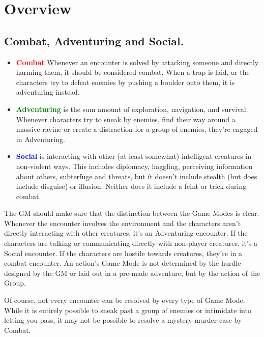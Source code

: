 \chapter{Overview}\label{ch:gameModeOverview}
\section{Combat, Adventuring and Social.}\label{sec:gameModeList}
\begin{itemize}
	\item \textcolor{red}{\textbf{Combat}} Whenever an encounter is solved by attacking someone and directly harming them, it should be considered combat.
	When a trap is laid, or the characters try to defeat enemies by pushing a boulder onto them, it is adventuring instead.

	\item \textcolor{green}{\textbf{Adventuring}} is the sum amount of exploration, navigation, and survival.
	Whenever characters try to sneak by enemies, find their way around a massive ravine or create a distraction for a group of enemies, they're engaged in Adventuring.

	\item \textcolor{blue}{\textbf{Social}} is interacting with other (at least somewhat) intelligent creatures in non-violent ways.
	This includes diplomacy, haggling, perceiving information about others, subterfuge and threats, but ít doesn't include stealth (but does include disguise) or illusion. 
	Neither does it include a feint or trick during combat.
	
\end{itemize}

The GM should make sure that the distinction between the Game Modes is clear. 
Whenever the encounter involves the environment and the characters aren't directly interacting with other creatures, it's an Adventuring encounter.
If the characters are talking or communicating directly with non-player creatures, it's a Social encounter.
If the characters are hostile towards creatures, they're in a combat encounter.
An action's Game Mode is not determined by the hurdle designed by the GM or laid out in a pre-made adventure, but by the action of the Group.

Of course, not every encounter can be resolved by every type of Game Mode. 
While it is entirely possible to sneak past a group of enemies or intimidate into letting you pass, it may not be possible to resolve a mystery-murder-case by Combat.

